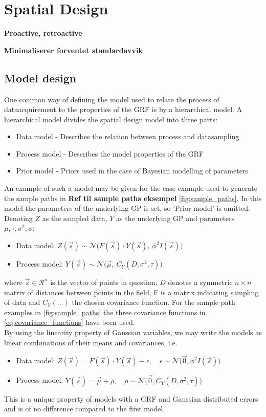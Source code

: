 \documentclass{article}
\begin{document}
\section{Spatial Design}
\textbf{Proactive, retroactive} 

\textbf{Minimaliserer forventet standardavvik} 

\subsection{Model design} \label{model:hm}
One common way of defining the model used to relate the process of dataacquirement to the properties of the GRF is by a hierarchical model. A hierarchical model divides the spatial design model 
into three parts: 
\begin{itemize}
\item Data model - Describes the relation between process and datasampling
\item Process model - Describes the model properties of the GRF 
\item Prior model - Priors used in the case of Bayesian modelling of parameters
\end{itemize}

An example of such a model may be given for the case example used to generate the sample paths in \textbf{Ref til sample paths eksempel} \ref{fig:sample_paths}. In this model the parameters of the underlying GP is set, so 'Prior model' is omitted. Denoting $Z$ as the sampled data, $Y$ as the underlying GP and parameters $\mu, \tau, \sigma^2, \phi$:
\begin{itemize}
\item Data model: $Z(\vec{s}) \sim \mathcal{N}\big(F(\vec{s}) \cdot Y(\vec{s}), \ \phi^2I(\vec{s})\big)$
\item Process model: $Y(\vec{s}) \sim \mathcal{N}\big( \vec{\mu}, \ C_Y(D, \sigma^2, \tau) \big)$ 
\end{itemize}
where $\vec{s} \in \mathcal{R}^n$ is the vector of points in question, $D$ denotes a symmetric $n \times n$ matrix of distances between points in the field, F is a matrix indicating sampling of data and $C_Y(\dots)$ the chosen covariance function. For the sample path examples in \ref{fig:sample_paths} the three covariance functions in \ref{eq:covariance_functions} have been used. \\

By using the linearity property of Gaussian variables, we may write the models as linear combinations of their means and covariances, i.e. 
\begin{itemize}
\item Data model: $Z(\vec{s}) = F(\vec{s}) \cdot Y(\vec{s}) + \epsilon, \quad \epsilon \sim \mathcal{N} \big(\vec{0},\phi^2I(\vec{s}) \big)$
\item Process model: $Y(\vec{s}) = \vec{\mu} + \rho, \quad \rho \sim \mathcal{N} \big(\vec{0}, C_Y(D, \sigma^2, \tau ) \big) $ 
\end{itemize}
This is a unique property of models with a GRF and Gaussian distributed errors and is of no difference compared to the first model.
\end{document}
